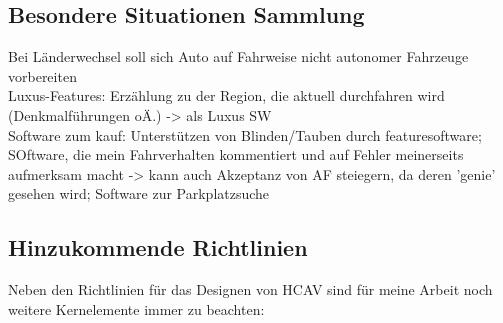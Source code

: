 \subsection{Besondere Situationen Sammlung}
Bei Länderwechsel soll sich Auto auf Fahrweise nicht autonomer Fahrzeuge vorbereiten\\
Luxus-Features: Erzählung zu der Region, die aktuell durchfahren wird (Denkmalführungen oÄ.) -> als Luxus SW\\
Software zum kauf: Unterstützen von Blinden/Tauben durch featuresoftware; SOftware, die mein Fahrverhalten kommentiert und auf Fehler meinerseits aufmerksam macht -> kann auch Akzeptanz von AF steiegern, da deren 'genie' gesehen wird; Software zur Parkplatzsuche\\
\subsection{Hinzukommende Richtlinien}
Neben den Richtlinien für das Designen von HCAV sind für meine Arbeit noch weitere Kernelemente immer zu beachten:

